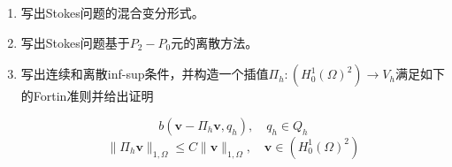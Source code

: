 \documentclass[12pt,a4paper]{article}
\begin{document}
\begin{enumerate}
		\begin{enumerate}
			\item 写出Stokes问题的混合变分形式。
			\item 写出Stokes问题基于$P_2-P_0$元的离散方法。
			\item 写出连续和离散inf-sup条件，并构造一个插值$\Pi_h:(H_0^1(\Omega)^2) \rightarrow V_h$满足如下的Fortin准则并给出证明
			
			$$b(\boldsymbol{v}-\Pi_h \boldsymbol{v},q_h),\quad q_h \in Q_h$$
			$$\|\Pi_h \boldsymbol{v}\|_{1,\Omega} \leq C\|\boldsymbol{v}\|_{1,\Omega}, \quad \boldsymbol{v} \in (H_0^1(\Omega)^2)$$
		\end{enumerate}
	\end{enumerate}
	
\end{document}
